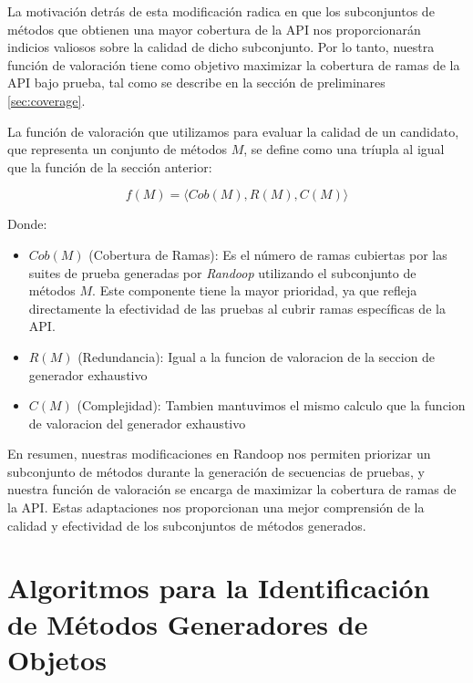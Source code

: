 La motivación detrás de esta modificación radica en que los subconjuntos de métodos que obtienen una mayor cobertura de la API nos proporcionarán indicios valiosos sobre la calidad de dicho subconjunto. Por lo tanto, nuestra función de valoración tiene como objetivo maximizar la cobertura de ramas de la API bajo prueba, tal como se describe en la sección de preliminares \ref{sec:coverage}.

La función de valoración que utilizamos para evaluar la calidad de un candidato, que representa un conjunto de métodos $M$, se define como una tríupla al igual que la función de la sección anterior:

\[
f(M) = \langle Cob(M), R(M), C(M) \rangle
\]

Donde:

\begin{itemize}
    \item $Cob(M)$ (Cobertura de Ramas): Es el número de ramas cubiertas por las suites de prueba generadas por \emph{Randoop} utilizando el subconjunto de métodos $M$. Este componente tiene la mayor prioridad, ya que refleja directamente la efectividad de las pruebas al cubrir ramas específicas de la API.
    \item $R(M)$ (Redundancia): Igual a la funcion de valoracion de la seccion de generador exhaustivo
    \item $C(M)$ (Complejidad): Tambien mantuvimos el mismo calculo que la funcion de valoracion del generador exhaustivo
\end{itemize}

En resumen, nuestras modificaciones en Randoop nos permiten priorizar un subconjunto de métodos durante la generación de secuencias de pruebas, y nuestra función de valoración se encarga de maximizar la cobertura de ramas de la API. Estas adaptaciones nos proporcionan una mejor comprensión de la calidad y efectividad de los subconjuntos de métodos generados.


\section{Algoritmos para la Identificación de Métodos Generadores de Objetos}
\label{sec:algorithms}


